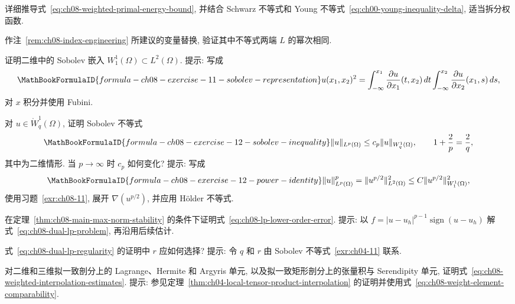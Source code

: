 \begin{MBExercise}
\label{exr:ch08-09}
详细推导式~\eqref{eq:ch08-weighted-primal-energy-bound}, 并结合 Schwarz 不等式和 Young 不等式~\eqref{eq:ch00-young-inequality-delta}, 适当拆分权函数.
\end{MBExercise}

\begin{MBExercise}
\label{exr:ch08-10}
作注~\ref{rem:ch08-index-engineering} 所建议的变量替换, 验证其中不等式两端 $L$ 的幂次相同.
\end{MBExercise}

\begin{MBExercise}
\label{exr:ch08-11}
证明二维中的 Sobolev 嵌入 $W_1^1(\Omega)\subset L^2(\Omega)$. 提示: 写成
\[
\MathBookFormulaID{formula-ch08-exercise-11-sobolev-representation}
u(x_1,x_2)^2
=\int_{-\infty}^{x_1}\frac{\partial u}{\partial x_1}(t,x_2)\,dt
\int_{-\infty}^{x_2}\frac{\partial u}{\partial x_2}(x_1,s)\,ds,
\]
对 $x$ 积分并使用 Fubini.
\end{MBExercise}

\begin{MBExercise}
\label{exr:ch08-12}
对 $u\in\mathring W_q^1(\Omega)$, 证明 Sobolev 不等式
\[
\MathBookFormulaID{formula-ch08-exercise-12-sobolev-inequality}
\|u\|_{L^p(\Omega)}\leq c_p\|u\|_{W_q^1(\Omega)},
\qquad 1+\frac2p=\frac2q,
\]
其中为二维情形. 当 $p\to\infty$ 时 $c_p$ 如何变化? 提示: 写成
\[
\MathBookFormulaID{formula-ch08-exercise-12-power-identity}
\|u\|_{L^p(\Omega)}^p=\|u^{p/2}\|_{L^2(\Omega)}^2
\leq C\|u^{p/2}\|_{W_1^1(\Omega)}^2,
\]
使用习题~\ref{exr:ch08-11}, 展开 $\nabla(u^{p/2})$, 并应用 Hölder 不等式.
\end{MBExercise}

\begin{MBExercise}
\label{exr:ch08-13}
在定理~\ref{thm:ch08-main-max-norm-stability} 的条件下证明式~\eqref{eq:ch08-lp-lower-order-error}. 提示: 以 $f=|u-u_h|^{p-1}\operatorname{sign}(u-u_h)$ 解式~\eqref{eq:ch08-dual-lp-problem}, 再沿用后续估计.
\end{MBExercise}

\begin{MBExercise}
\label{exr:ch08-14}
式~\eqref{eq:ch08-dual-lp-regularity} 的证明中 $r$ 应如何选择? 提示: 令 $q$ 和 $r$ 由 Sobolev 不等式~\ref{exr:ch04-11} 联系.
\end{MBExercise}

\begin{MBExercise}
\label{exr:ch08-15}
对二维和三维拟一致剖分上的 Lagrange、Hermite 和 Argyris 单元, 以及拟一致矩形剖分上的张量积与 Serendipity 单元, 证明式~\eqref{eq:ch08-weighted-interpolation-estimates}. 提示: 参见定理~\ref{thm:ch04-local-tensor-product-interpolation} 的证明并使用式~\eqref{eq:ch08-weight-element-comparability}.
\end{MBExercise}

